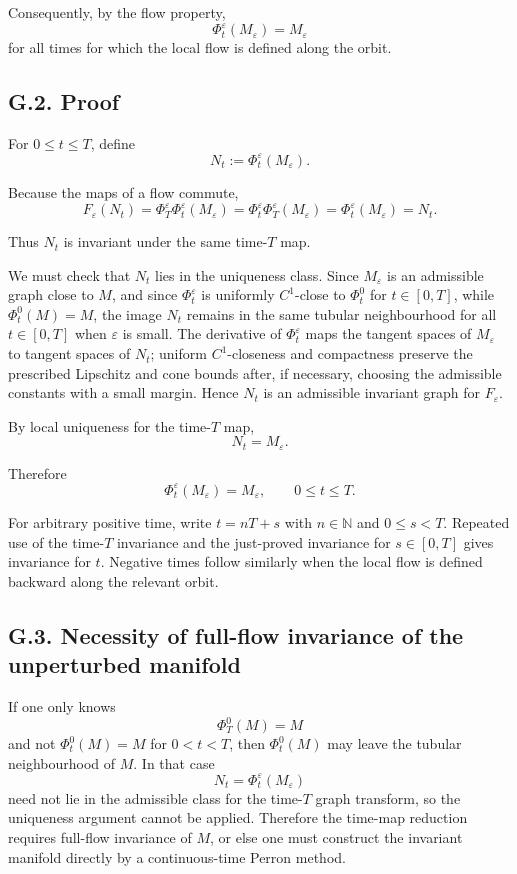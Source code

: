 \documentclass[12pt,a4paper]{article}
\theoremstyle{plain}
\numberwithin{equation}{section}
\numberwithin{theorem}{section}
\begin{document}
Consequently, by the flow property,
\[
\Phi_t^\varepsilon(M_\varepsilon)=M_\varepsilon
\]
for all times for which the local flow is defined along the orbit.

\subsection{G.2. Proof}

For $0\le t\le T$, define
\[
N_t:=\Phi_t^\varepsilon(M_\varepsilon).
\]

Because the maps of a flow commute,
\[
F_\varepsilon(N_t)
=
\Phi_T^\varepsilon\Phi_t^\varepsilon(M_\varepsilon)
=
\Phi_t^\varepsilon\Phi_T^\varepsilon(M_\varepsilon)
=
\Phi_t^\varepsilon(M_\varepsilon)
=N_t.
\]

Thus $N_t$ is invariant under the same time-$T$ map.

We must check that $N_t$ lies in the uniqueness class. Since $M_\varepsilon$ is an admissible graph close to $M$, and since $\Phi_t^\varepsilon$ is uniformly $C^1$-close to $\Phi_t^0$ for $t\in[0,T]$, while $\Phi_t^0(M)=M$, the image $N_t$ remains in the same tubular neighbourhood for all $t\in[0,T]$ when $\varepsilon$ is small. The derivative of $\Phi_t^\varepsilon$ maps the tangent spaces of $M_\varepsilon$ to tangent spaces of $N_t$; uniform $C^1$-closeness and compactness preserve the prescribed Lipschitz and cone bounds after, if necessary, choosing the admissible constants with a small margin. Hence $N_t$ is an admissible invariant graph for $F_\varepsilon$.

By local uniqueness for the time-$T$ map,
\[
N_t=M_\varepsilon.
\]

Therefore
\[
\Phi_t^\varepsilon(M_\varepsilon)=M_\varepsilon,
\qquad 0\le t\le T.
\]

For arbitrary positive time, write $t=nT+s$ with $n\in\mathbb N$ and $0\le s<T$. Repeated use of the time-$T$ invariance and the just-proved invariance for $s\in[0,T]$ gives invariance for $t$. Negative times follow similarly when the local flow is defined backward along the relevant orbit.

\subsection{G.3. Necessity of full-flow invariance of the unperturbed manifold}

If one only knows
\[
\Phi_T^0(M)=M
\]
and not $\Phi_t^0(M)=M$ for $0<t<T$, then $\Phi_t^0(M)$ may leave the tubular neighbourhood of $M$. In that case
\[
N_t=\Phi_t^\varepsilon(M_\varepsilon)
\]
need not lie in the admissible class for the time-$T$ graph transform, so the uniqueness argument cannot be applied. Therefore the time-map reduction requires full-flow invariance of $M$, or else one must construct the invariant manifold directly by a continuous-time Perron method.
\end{document}
